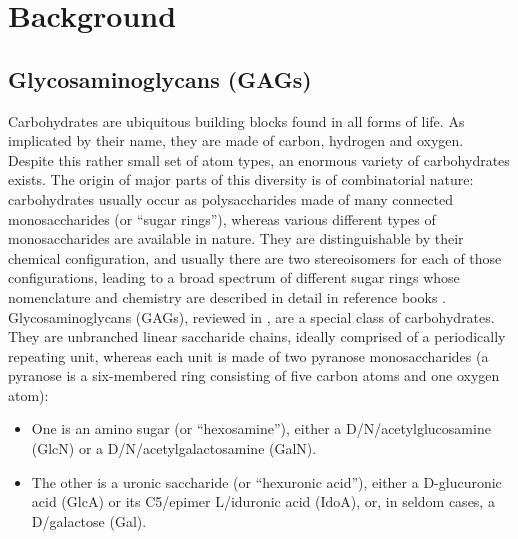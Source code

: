 \chapter{Background}
\label{background}

\section{Glycosaminoglycans (GAGs)}
\label{background:gags}

Carbohydrates are ubiquitous building blocks found in all forms of life. As
implicated by their name, they are made of carbon, hydrogen and oxygen. Despite
this rather small set of atom types, an enormous variety of carbohydrates
exists. The origin of major parts of this diversity is of combinatorial nature:
carbohydrates usually occur as polysaccharides made of many connected
monosaccharides (or \enquote{sugar rings}), whereas various different types of
monosaccharides are available in nature. They are distinguishable by their
chemical configuration, and usually there are two stereoisomers for each of
those configurations, leading to a broad spectrum of different sugar rings whose
nomenclature and chemistry are described in detail in reference books
\cite{carbohydrate_chemistry_robyt_1998, carbohydrate_chemistry_royal_2000}.
Glycosaminoglycans (GAGs), reviewed in
\cite{essentials_glycobiology_gags_chapter_2009}, are a special class of
carbohydrates. They are unbranched linear saccharide chains, ideally comprised
of a periodically repeating unit, whereas each unit is made of two pyranose
monosaccharides (a pyranose is a six-membered ring consisting of five carbon
atoms and one oxygen atom):


\begin{itemize}
\item One is an amino sugar (or \enquote{hexosamine}), either a
D\-/N\-/acetylglucosamine (GlcN) or a D\-/N\-/acetylgalactosamine (GalN).
\item The other is a uronic saccharide (or \enquote{hexuronic acid}), either a
D-glucuronic acid (GlcA) or its C5\-/epimer L\-/iduronic acid (IdoA), or, in
seldom cases, a D\-/galactose (Gal).
\end{itemize}



